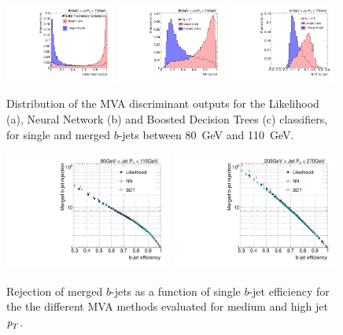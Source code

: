 \begin{figure}[tp]
\centering
\includegraphics[width=0.32\textwidth]{FIGS/Likelihood/NNoutput080_LihoodKDE.pdf}
\includegraphics[width=0.32\textwidth]{FIGS/Likelihood/NNoutput080_MLP.pdf}
\includegraphics[width=0.32\textwidth]{FIGS/Likelihood/NNoutput080_BDT.pdf}
\caption{Distribution of the MVA discriminant outputs for the Likelihood (a), Neural Network (b) and Boosted Decision Trees (c) classifiers, for single and merged $b$-jets between 80~GeV and 110~GeV.}
\label{fig:diffmethodsBins}
\end{figure}


\begin{figure}[tp]
\centering
\includegraphics[width=0.49\textwidth]{FIGS/TEMPFigs/MVA_differentMethods/bins/MVAs_RejvsEff80.pdf}
\includegraphics[width=0.49\textwidth]{FIGS/TEMPFigs/MVA_differentMethods/bins/MVAs_RejvsEff200.pdf}
\caption{Rejection of merged $b$-jets as a function of single $b$-jet efficiency for the the different MVA methods evaluated for medium and high jet ${\emph{p}_{T}}$.}
\label{fig:diffmethodsPerfBins}
\end{figure}



